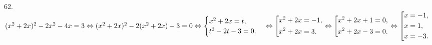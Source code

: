 62. $(x^2+2x)^2-2x^2-4x=3\Leftrightarrow(x^2+2x)^2-2(x^2+2x)-3=0\Leftrightarrow\begin{cases}x^2+2x=t,\\ t^2-2t-3=0.\end{cases}
\Leftrightarrow\left[
      \begin{gathered}
      x^2+2x=-1,\hfill\\
      x^2+2x=3.\hfill
      \end{gathered}\right.\Leftrightarrow\left[
      \begin{gathered}
      x^2+2x+1=0,\hfill\\
      x^2+2x-3=0.\hfill
      \end{gathered}\right.\Leftrightarrow\left[
      \begin{gathered}
      x=-1,\hfill\\
      x=1,\hfill\\
      x=-3.\hfill
      \end{gathered}\right.$\\
